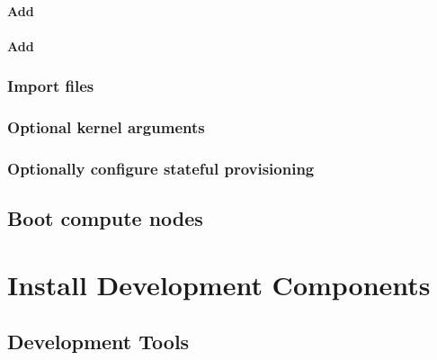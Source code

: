 \documentclass[letterpaper]{article}
\begin{document}
\paragraph{Add \conman{}} \label{sec:add_conman}


\paragraph{Add \nhc{}} \label{sec:add_nhc}



\subsubsection{Import files} \label{sec:file_import}







\vspace*{0.2cm}
\subsubsection{Optional kernel arguments} \label{sec:optional_kargs}




\subsubsection{Optionally configure stateful provisioning}


\vspace*{-0.1cm}
\subsection{Boot compute nodes} \label{sec:boot_computes}
 

\section{Install \OHPC{} Development Components} \label{sec:install_dev}


\subsection{Development Tools} \label{sec:install_dev_tools}

\end{document}
